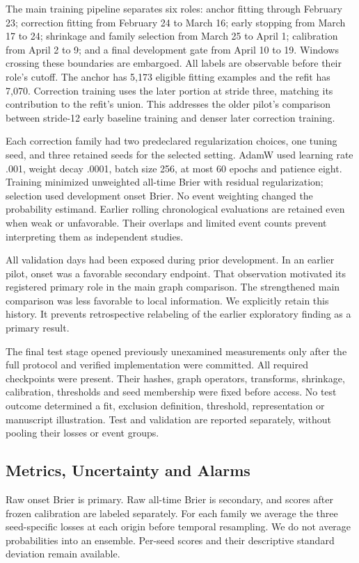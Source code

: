 \documentclass{llncs}
\begin{document}
The main training pipeline separates six roles: anchor fitting through February 23; correction fitting from February 24 to March 16; early stopping from March 17 to 24; shrinkage and family selection from March 25 to April 1; calibration from April 2 to 9; and a final development gate from April 10 to 19. Windows crossing these boundaries are embargoed. All labels are observable before their role's cutoff. The anchor has 5,173 eligible fitting examples and the refit has 7,070. Correction training uses the later portion at stride three, matching its contribution to the refit's union. This addresses the older pilot's comparison between stride-12 early baseline training and denser later correction training.

Each correction family had two predeclared regularization choices, one tuning seed, and three retained seeds for the selected setting. AdamW used learning rate .001, weight decay .0001, batch size 256, at most 60 epochs and patience eight. Training minimized unweighted all-time Brier with residual regularization; selection used development onset Brier. No event weighting changed the probability estimand. Earlier rolling chronological evaluations are retained even when weak or unfavorable. Their overlaps and limited event counts prevent interpreting them as independent studies.

All validation days had been exposed during prior development. In an earlier pilot, onset was a favorable secondary endpoint. That observation motivated its registered primary role in the main graph comparison. The strengthened main comparison was less favorable to local information. We explicitly retain this history. It prevents retrospective relabeling of the earlier exploratory finding as a primary result.

The final test stage opened previously unexamined measurements only after the full protocol and verified implementation were committed. All required checkpoints were present. Their hashes, graph operators, transforms, shrinkage, calibration, thresholds and seed membership were fixed before access. No test outcome determined a fit, exclusion definition, threshold, representation or manuscript illustration. Test and validation are reported separately, without pooling their losses or event groups.

\subsection{Metrics, Uncertainty and Alarms}
Raw onset Brier is primary. Raw all-time Brier is secondary, and scores after frozen calibration are labeled separately. For each family we average the three seed-specific losses at each origin before temporal resampling. We do not average probabilities into an ensemble. Per-seed scores and their descriptive standard deviation remain available.
\end{document}
